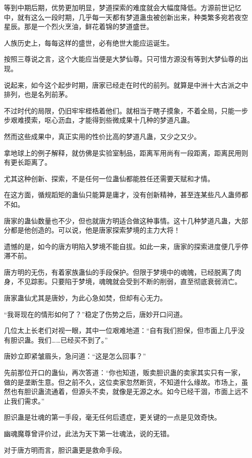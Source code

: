 \begin{this_body}
等到中期后期，优势更加明显，梦道探索的难度就会大幅度降低。方源前世记忆中，就有这么一段时期，几乎每一天都有梦道蛊虫被创新出来，种类繁多宛若夜空星辰。那是一个烈火烹油，鲜花着锦的梦道盛世。

人族历史上，每每这样的盛世，必有绝世大能应运诞生。

按照三尊说之言，这个大能应当便是大梦仙尊。只可惜方源没有等到大梦仙尊的出现。

说起来，如今这个起步时期，唐家已经走在时代的前列。就算是中洲十大古派之中排列，也是名列前茅。

不过时代的局限，仍旧牢牢桎梏着他们。就相当于瞎子摸象，不着全局，只能一步步艰难摸索，呕心沥血，才能得到些微成果十几种的梦道凡蛊。

然而这些成果中，真正实用的性价比高的梦道凡蛊，又少之又少。

拿地球上的例子解释，就仿佛是实验室制品，距离军用尚有一段距离，距离民用则有更长距离了。

尤其这种创新、探索，不是任何一位蛊仙都能胜任还需要天赋和才情。

在这方面，循规蹈矩的蛊仙只能算是庸才，没有创新精神，甚至连某些凡人蛊师都不如。

唐家的蛊仙数量也不少，但也就唐方明适合做这种事情。这十几种梦道凡蛊，大部分都是他创造的。可以说，他是唐家探索梦境的主力大将！

遗憾的是，如今的唐方明陷入梦境不能自拔。如此一来，唐家的探索进度便几乎停滞不前。

唐方明的无伤，有着家族蛊仙的手段保护。但限于梦境中的魂魄，已经脱离了肉身，不见踪影。只要陷于梦境，魂魄就会受到不断的削弱，直至彻底衰弱消亡。

唐家蛊仙尤其是唐妙，为此心急如焚，但却有心无力。

“我哥现在的情形如何了？”稳定了伤势之后，唐妙开口问道。

几位太上长老们对视一眼，其中一位艰难地道：“自有我们担保，但市面上几乎没有胆识蛊。我们……已经买不到了。”

唐妙立即紧皱眉头，急问道：“这是怎么回事？”

先前那位开口的蛊仙，再次答道：“你也知道，贩卖胆识蛊的卖家其实只有一家，做的是垄断生意。但之前不久，这位卖家忽然断货，不知道什么缘故。市场上，虽然也有胆识蛊流通着，但源头不卖，就像是无源之水。如今已经干涸，市面上远不止我们需求。”

胆识蛊是壮魂的第一手段，毫无任何后遗症，更关键的一点是见效奇快。

幽魂魔尊曾评价过，此法为天下第一壮魂法，说的无错。

对于唐方明而言，胆识蛊更是救命手段。


\end{this_body}
